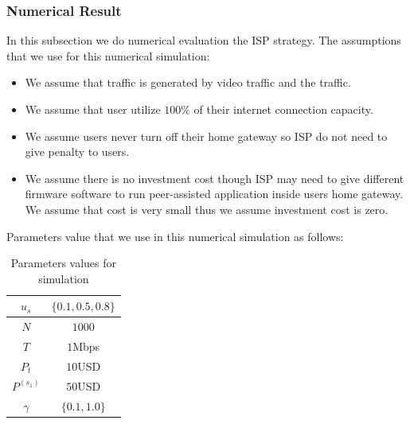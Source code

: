 \documentclass[paper]{ieice}
\begin{document}
\subsubsection{Numerical Result}
In this subsection we do numerical evaluation the ISP strategy.
The assumptions that we use for this numerical simulation:
\begin{itemize}
	\item We assume that  traffic is generated by video traffic and the traffic.
	\item We assume that user utilize $100\%$ of their internet connection capacity.  
	\item We assume users never turn off their home gateway so ISP do not need to give penalty to users.
	\item We assume there is no investment cost though ISP may need to give different firmware software to run peer-assisted application inside users home gateway. We assume that cost is very small thus we assume investment cost is zero.
\end{itemize}
Parameters value that we use in this numerical simulation as follows:
\begin{table}[thb]%
\caption{Parameters values for simulation}
\label{table:1}
\begin{center}
\begin{tabular}{c|c}
\hline
$u_s$ & $\{0.1, 0.5, 0.8\}$ \\
\hline
$N$ & $1000$\\
\hline
$T$ & $1$Mbps \\
\hline
$P_t$ & $10$USD \\
\hline
$P^{(s_1)}$ & $50$USD\\
\hline
$\gamma$ & $\{0.1,1.0\}$ \\
\hline
\end{tabular}
\end{center}
\end{table}
\end{document}
